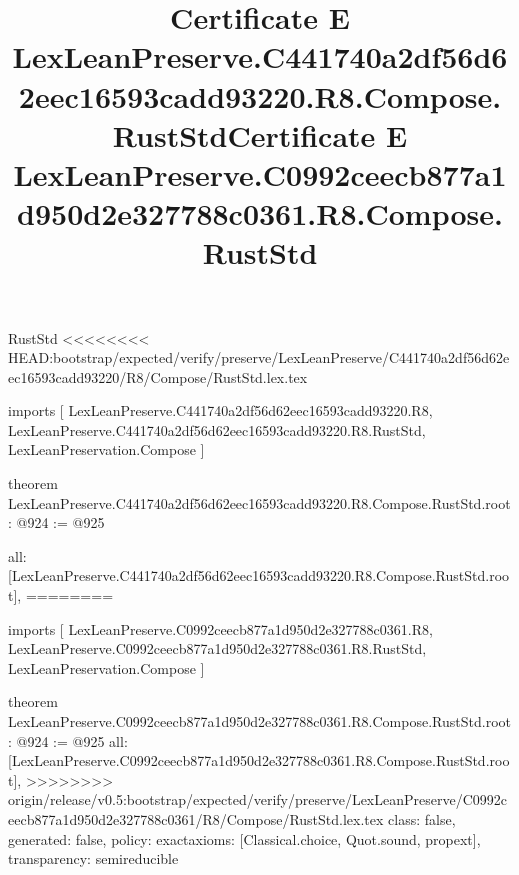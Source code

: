 \begin{lexlean}{RustStd}
<<<<<<<< HEAD:bootstrap/expected/verify/preserve/LexLeanPreserve/C441740a2df56d62eec16593cadd93220/R8/Compose/RustStd.lex.tex
\title{Certificate E LexLeanPreserve.C441740a2df56d62eec16593cadd93220.R8.Compose.RustStd}
\begin{coremodule}
imports [
  LexLeanPreserve.C441740a2df56d62eec16593cadd93220.R8,
  LexLeanPreserve.C441740a2df56d62eec16593cadd93220.R8.RustStd,
  LexLeanPreservation.Compose
]

theorem LexLeanPreserve.C441740a2df56d62eec16593cadd93220.R8.Compose.RustStd.root : @924 := @925 {
  all: [LexLeanPreserve.C441740a2df56d62eec16593cadd93220.R8.Compose.RustStd.root],
========
\title{Certificate E LexLeanPreserve.C0992ceecb877a1d950d2e327788c0361.R8.Compose.RustStd}
\begin{coremodule}
imports [
  LexLeanPreserve.C0992ceecb877a1d950d2e327788c0361.R8,
  LexLeanPreserve.C0992ceecb877a1d950d2e327788c0361.R8.RustStd,
  LexLeanPreservation.Compose
]

theorem LexLeanPreserve.C0992ceecb877a1d950d2e327788c0361.R8.Compose.RustStd.root : @924 := @925 {
  all: [LexLeanPreserve.C0992ceecb877a1d950d2e327788c0361.R8.Compose.RustStd.root],
>>>>>>>> origin/release/v0.5:bootstrap/expected/verify/preserve/LexLeanPreserve/C0992ceecb877a1d950d2e327788c0361/R8/Compose/RustStd.lex.tex
  class: false,
  generated: false,
  policy: exact{axioms: [Classical.choice, Quot.sound, propext]},
  transparency: semireducible
}


\end{coremodule}}
\end{coremodule}
\end{lexlean}
